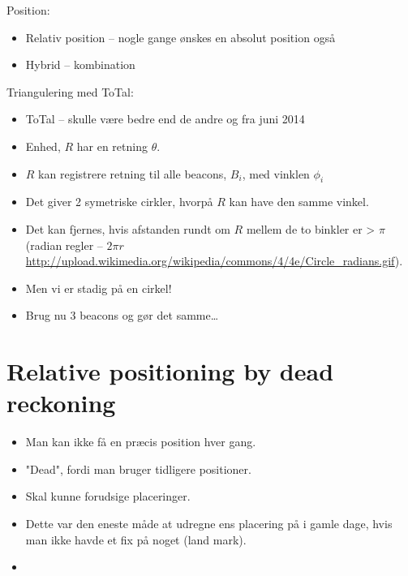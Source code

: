 \documentclass[oneside, 10pt]{article}
\begin{document}
Position:
\begin{itemize}
	\item Relativ position -- nogle gange ønskes en absolut position også
	\item Hybrid -- kombination
\end{itemize}

Triangulering med ToTal:
\begin{itemize}
	\item ToTal -- skulle være bedre end de andre og fra juni 2014
	\item Enhed, $R$ har en retning $\theta$. 
	\item $R$ kan registrere retning til alle beacons, $B_i$, med vinklen $\phi_i$
	\item Det giver 2 symetriske cirkler, hvorpå $R$ kan have den samme vinkel.
	\item Det kan fjernes, hvis afstanden rundt om $R$ mellem de to binkler er > $\pi$ (radian regler -- $2\pi r$ \url{http://upload.wikimedia.org/wikipedia/commons/4/4e/Circle_radians.gif}).
	\item[] Men vi er stadig på en cirkel!

	\item Brug nu 3 beacons og gør det samme\dots
\end{itemize}









\newpage
\section{Relative positioning by dead reckoning}

\begin{itemize}
	\item Man kan ikke få en præcis position hver gang.
	\item "Dead", fordi man bruger tidligere positioner.
	\item Skal kunne forudsige placeringer.
	\item Dette var den eneste måde at udregne ens placering på i gamle dage, hvis man ikke havde et fix på noget (land mark).
	\item 
\end{itemize}
\end{document}
